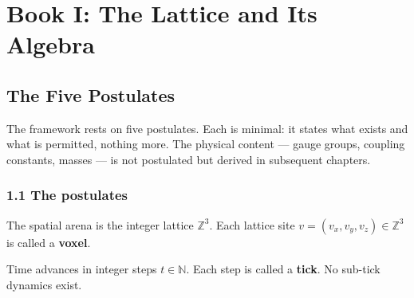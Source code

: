 \documentclass[
  11pt,
  letterpaper,
  twoside,
  openright]{book}
\begin{document}
\part{Book I: The Lattice and Its Algebra}

\chapter{The Five Postulates}\label{the-five-postulates}

The framework rests on five postulates. Each is minimal: it states what
exists and what is permitted, nothing more. The physical content ---
gauge groups, coupling constants, masses --- is not postulated but
derived in subsequent chapters.

\section{1.1 The postulates}\label{the-postulates}

\begin{ftdaxiom}

The spatial arena is the integer lattice \(\mathbb{Z}^3\). Each lattice
site \(v = (v_x, v_y, v_z) \in \mathbb{Z}^3\) is called a
\textbf{voxel}.

\end{ftdaxiom}

\begin{ftdaxiom}

Time advances in integer steps \(t \in \mathbb{N}\). Each step is called
a \textbf{tick}. No sub-tick dynamics exist.

\end{ftdaxiom}
\end{document}
